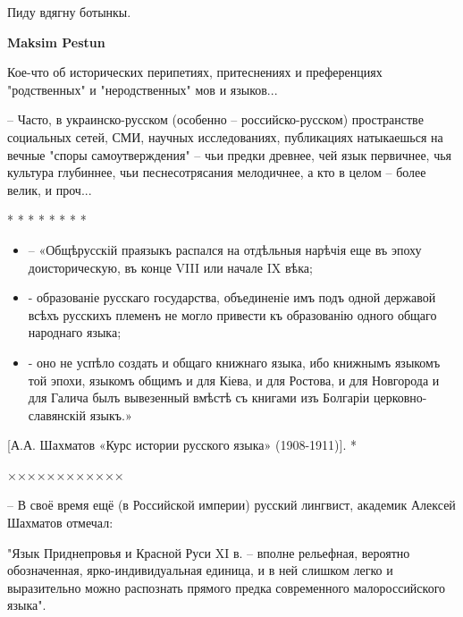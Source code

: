 \begin{itemize}
\begin{itemize}
\end{itemize}

 
Пиду вдягну ботынкы.

 
\textbf{Maksim Pestun}

Кое-что об исторических перипетиях, притеснениях и преференциях "родственных" и "неродственных" мов и языков...

– Часто, в украинско-русском (особенно – российско-русском) пространстве
социальных сетей, СМИ, научных исследованиях, публикациях натыкаешься на вечные
"споры самоутверждения" – чьи предки древнее, чей язык первичнее, чья культура
глубиннее, чьи песнесотрясания мелодичнее, а кто в целом – более велик, и
проч...

* * * * * * * *
\begin{itemize}
\item – «Общѣрусскій праязыкъ распался на отдѣльныя нарѣчія еще въ эпоху доисторическую, въ конце VIII или начале IX вѣка;

\item - образованіе русскаго государства, объединеніе имъ подъ одной державой всѣхъ
русскихъ племенъ не могло привести къ образованію одного общаго народнаго
языка;

\item - оно не успѣло создать и общаго книжнаго языка, ибо книжнымъ языкомъ той эпохи,
языкомъ общимъ и для Кіева, и для Ростова, и для Новгорода и для Галича былъ
вывезенный вмѣстѣ съ книгами изъ Болгаріи церковно-славянскій языкъ.»
\end{itemize}

[А.А. Шахматов «Курс истории русского языка» (1908-1911)]. *

××××××××××××

– В своё время ещё (в Российской империи) русский лингвист, академик Алексей Шахматов отмечал:

"Язык Приднепровья и Красной Руси XI в. – вполне рельефная, вероятно
обозначенная, ярко-индивидуальная единица, и в ней слишком легко и выразительно
можно распознать прямого предка современного малороссийского языка".


\end{itemize}
